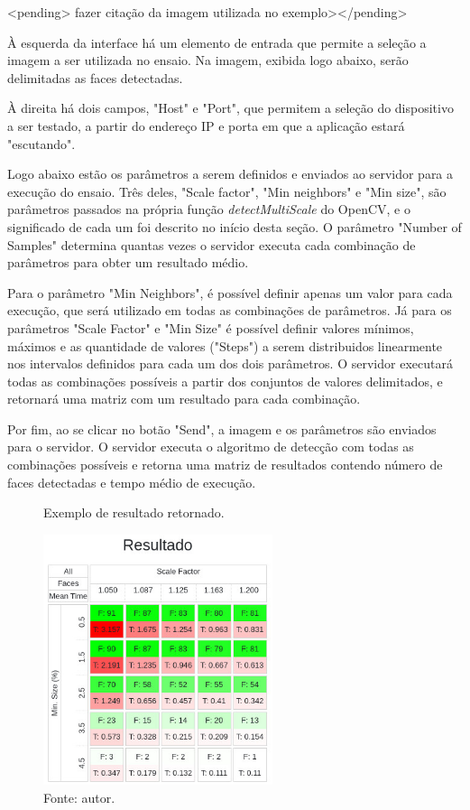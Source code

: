 <pending> fazer citação da imagem utilizada no exemplo></pending>

À esquerda da interface há um elemento de entrada que permite a seleção a imagem a ser utilizada no ensaio. Na imagem, exibida logo abaixo, serão delimitadas as faces detectadas.

À direita há dois campos, "Host" e "Port", que permitem a seleção do dispositivo a ser testado, a partir do endereço IP e porta em que a aplicação estará "escutando".

Logo abaixo estão os parâmetros a serem definidos e enviados ao servidor para a execução do ensaio. Três deles, "Scale factor", "Min neighbors" e "Min size", são parâmetros passados na própria função \textit{detectMultiScale} do OpenCV, e o significado de cada um foi descrito no início desta seção. O parâmetro "Number of Samples" determina quantas vezes o servidor executa cada combinação de parâmetros para obter um resultado médio.

Para o parâmetro "Min Neighbors", é possível definir apenas um valor para cada execução, que será utilizado em todas as combinações de parâmetros. Já para os parâmetros "Scale Factor" e "Min Size" é possível definir valores mínimos, máximos e as quantidade de valores ("Steps") a serem distribuidos linearmente nos intervalos definidos para cada um dos dois parâmetros. O servidor executará todas as combinações possíveis a partir dos conjuntos de valores delimitados, e retornará uma matriz com um resultado para cada combinação.

Por fim, ao se clicar no botão "Send", a imagem e os parâmetros são enviados para o servidor. O servidor executa o algoritmo de detecção com todas as combinações possíveis e retorna uma matriz de resultados contendo número de faces detectadas e tempo médio de execução.

\begin{figure}[h]
    \centering
    \caption[Exemplo de resultado retornado.]{Exemplo de resultado retornado.}
    \includegraphics[width=0.6\textwidth]{Cap3_Desenvolvimento/Figures/exemplo_resultado_matriz.jpg}
    \caption*{Fonte: autor.}
    \label{fig:matrizResultado}
\end{figure}

